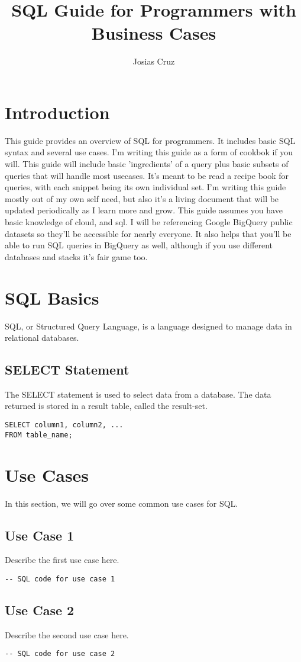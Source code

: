 \documentclass{article}
\begin{document}
\title{SQL Guide for Programmers with Business Cases}
\author{Josias Cruz}
\maketitle

\section{Introduction}
This guide provides an overview of SQL for programmers. It includes basic SQL syntax and several use cases. I'm writing this guide as a form of 
cookbok if you will. This guide will include basic 'ingredients' of a query plus basic subsets of queries that will handle most usecases.
It's meant to be read a recipe book for queries, with each snippet being its own individual set. I'm writing this guide mostly out of my own self need,
but also it's a living document that will be updated periodically as I learn more and grow. This guide assumes you have basic knowledge of cloud, and sql.
I will be referencing Google BigQuery public datasets so they'll be accessible for nearly everyone. It also helps that you'll be able to run SQL queries in BigQuery
as well, although if you use different databases and stacks it's fair game too. 

\section{SQL Basics}
SQL, or Structured Query Language, is a language designed to manage data in relational databases.



\subsection{SELECT Statement}
The SELECT statement is used to select data from a database. The data returned is stored in a result table, called the result-set.

\begin{lstlisting}
SELECT column1, column2, ...
FROM table_name;
\end{lstlisting}

\section{Use Cases}
In this section, we will go over some common use cases for SQL.

\subsection{Use Case 1}
Describe the first use case here.

\begin{lstlisting}
-- SQL code for use case 1
\end{lstlisting}

\subsection{Use Case 2}
Describe the second use case here.

\begin{lstlisting}
-- SQL code for use case 2
\end{lstlisting}
\end{document}
